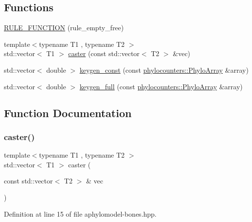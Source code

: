 \subsection*{Functions}
\begin{DoxyCompactItemize}
\item 
\hyperlink{aphylomodel-bones_8hpp_a11c7dd7dca27f32547bb602f30ceb5e8}{R\+U\+L\+E\+\_\+\+F\+U\+N\+C\+T\+I\+ON} (rule\+\_\+empty\+\_\+free)
\item 
{\footnotesize template$<$typename T1 , typename T2 $>$ }\\std\+::vector$<$ T1 $>$ \hyperlink{aphylomodel-bones_8hpp_a1f293b9028bf34b1aa8506c8f0af4413}{caster} (const std\+::vector$<$ T2 $>$ \&vec)
\item 
std\+::vector$<$ double $>$ \hyperlink{aphylomodel-bones_8hpp_a513c16e4b1a39f810501041e7b8fa448}{keygen\+\_\+const} (const \hyperlink{namespacebarry_1_1counters_1_1phylo_abd293bf65e494e903639fb5fb2c91604}{phylocounters\+::\+Phylo\+Array} \&array)
\item 
std\+::vector$<$ double $>$ \hyperlink{aphylomodel-bones_8hpp_aa60134cca317d64e4b3d1707380d5d0d}{keygen\+\_\+full} (const \hyperlink{namespacebarry_1_1counters_1_1phylo_abd293bf65e494e903639fb5fb2c91604}{phylocounters\+::\+Phylo\+Array} \&array)
\end{DoxyCompactItemize}


\subsection{Function Documentation}
\mbox{\label{aphylomodel-bones_8hpp_a1f293b9028bf34b1aa8506c8f0af4413}} 
\subsubsection{\texorpdfstring{caster()}{caster()}}
{\footnotesize\ttfamily template$<$typename T1 , typename T2 $>$ \\
std\+::vector$<$ T1 $>$ caster (\begin{DoxyParamCaption}\item[{const std\+::vector$<$ T2 $>$ \&}]{vec }\end{DoxyParamCaption})}



Definition at line 15 of file aphylomodel-\/bones.\+hpp.

